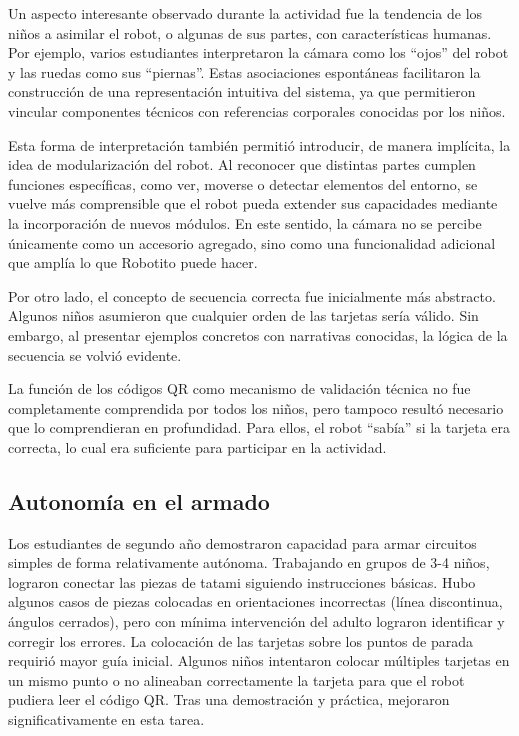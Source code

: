 \documentclass{prgrado}
\begin{document}
Un aspecto interesante observado durante la actividad fue la tendencia de los niños a asimilar el robot, o algunas de sus partes, con características humanas. Por ejemplo, varios estudiantes interpretaron la cámara como los ``ojos'' del robot y las ruedas como sus ``piernas''. Estas asociaciones espontáneas facilitaron la construcción de una representación intuitiva del sistema, ya que permitieron vincular componentes técnicos con referencias corporales conocidas por los niños.

Esta forma de interpretación también permitió introducir, de manera implícita, la idea de modularización del robot. Al reconocer que distintas partes cumplen funciones específicas, como ver, moverse o detectar elementos del entorno, se vuelve más comprensible que el robot pueda extender sus capacidades mediante la incorporación de nuevos módulos. En este sentido, la cámara no se percibe únicamente como un accesorio agregado, sino como una funcionalidad adicional que amplía lo que Robotito puede hacer.

Por otro lado, el concepto de secuencia correcta fue inicialmente más abstracto. Algunos niños asumieron que cualquier orden de las tarjetas sería válido. Sin embargo, al presentar ejemplos concretos con narrativas conocidas, la lógica de la secuencia se volvió evidente.

La función de los códigos QR como mecanismo de validación técnica no fue completamente comprendida por todos los niños, pero tampoco resultó necesario que lo comprendieran en profundidad. Para ellos, el robot ``sabía'' si la tarjeta era correcta, lo cual era suficiente para participar en la actividad.
\subsection{Autonomía en el armado}
Los estudiantes de segundo año demostraron capacidad para armar circuitos simples de forma relativamente autónoma. Trabajando en grupos de 3-4 niños, lograron conectar las piezas de tatami siguiendo instrucciones básicas. Hubo algunos casos de piezas colocadas en orientaciones incorrectas (línea discontinua, ángulos cerrados), pero con mínima intervención del adulto lograron identificar y corregir los errores.
La colocación de las tarjetas sobre los puntos de parada requirió mayor guía inicial. Algunos niños intentaron colocar múltiples tarjetas en un mismo punto o no alineaban correctamente la tarjeta para que el robot pudiera leer el código QR. Tras una demostración y práctica, mejoraron significativamente en esta tarea.
\end{document}

